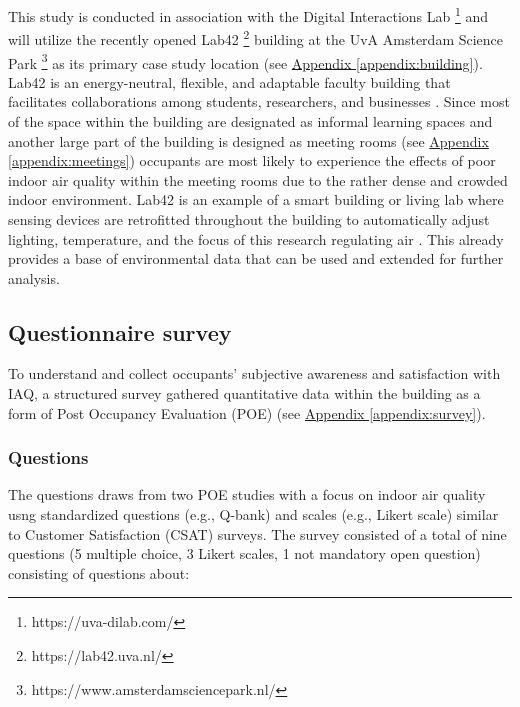This study is conducted in association with the Digital Interactions Lab \footnote{https://uva-dilab.com/} and will utilize the recently opened Lab42 \footnote{https://lab42.uva.nl/} building at the UvA Amsterdam Science Park \footnote{https://www.amsterdamsciencepark.nl/} as its primary case study location (see \hyperref[appendix:building]{Appendix \ref*{appendix:building}}). Lab42 is an energy-neutral, flexible, and adaptable faculty building that facilitates collaborations among students, researchers, and businesses \cite{benthem_2022}. Since most of the space within the building are designated as informal learning spaces and another large part of the building is designed as meeting rooms (see \hyperref[appendix:meetings]{Appendix \ref*{appendix:meetings}}) occupants are most likely to experience the effects of poor indoor air quality within the meeting rooms due to the rather dense and crowded indoor environment. Lab42 is an example of a smart building or living lab where sensing devices are retrofitted throughout the building to automatically adjust lighting, temperature, and the focus of this research regulating air \cite{architects_lab42_2022}. This already provides a base of environmental data that can be used and extended for further analysis. 

\newpage

\subsection{Questionnaire survey}
\label{sec:questionnaire}

To understand and collect occupants' subjective awareness and satisfaction with IAQ, a structured survey gathered quantitative data within the building as a form of Post Occupancy Evaluation (POE) (see \hyperref[appendix:survey]{Appendix \ref*{appendix:survey}}).


\subsubsection{Questions}
The questions draws from two POE studies with a focus on indoor air quality \cite{silva_post-occupancy_2017, son_perceived_2023} usng standardized questions (e.g., Q-bank) and scales (e.g., Likert scale) similar to Customer Satisfaction (CSAT) surveys. The survey consisted of a total of nine questions (5 multiple choice, 3 Likert scales, 1 not mandatory open question) consisting of questions about:

